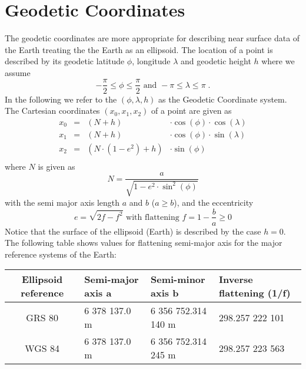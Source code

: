 \chapter{Geodetic Coordinates}\label{sec:geodetic}

The geodetic coordinates are more appropriate for describing near surface data of the Earth treating the 
the Earth as an ellipsoid. The location of a point 
is described by its geodetic latitude $\phi$, longitude $\lambda$ and geodetic height $h$ where we assume
\begin{equation}
  -\frac{\pi}{2} \le \phi \le \frac{\pi}{2} \mbox{ and } -\pi \le \lambda \le \pi \;.
\end{equation} 
In the following we refer to the $(\phi, \lambda, h)$ as the Geodetic Coordinate system.
The Cartesian coordinates $(x_0,x_1,x_2)$ of a point are given as 
\begin{equation}
\begin{array}{rcll}
   x_0 & = &  (N + h) & \cdot \cos(\phi) \cdot  \cos(\lambda) \\
   x_1 & = &  (N + h) & \cdot  \cos(\phi) \cdot  \sin(\lambda) \\
   x_2 & = &  (N \cdot (1-e^2) + h ) & \cdot  \sin(\phi)\\
\end{array}
\label{equ:geodetic:1}
\end{equation} 
where $N$ is given as 
\begin{equation}
 N = \frac{a}{\sqrt{1- e^2 \cdot \sin^2(\phi) }}
\label{equ:geodetic:2}
\end{equation}
with the semi major axis length $a$ and $b$ ($ a \ge b$), and the eccentricity 
\begin{equation}
e = \sqrt{2f - f^2} \mbox{ with flattening } f = 1-\frac{b}{a} \ge 0
\label{equ:geodetic:3}
\end{equation}
Notice that the surface of the ellipsoid (Earth) is described by the case $h=0$.  The following 
table shows values for  flattening semi-major axis for the major reference systems of the Earth:
\begin{center}
\begin{tabular}{c|lll}
Ellipsoid reference & Semi-major axis a & Semi-minor axis b & Inverse flattening (1/f)\\
\hline
GRS 80 & 6 378 137.0 m & 6 356 752.314 140 m & 298.257 222 101\\
WGS 84 & 6 378 137.0 m & 6 356 752.314 245 m & 298.257 223 563
\end{tabular}
\end{center}
